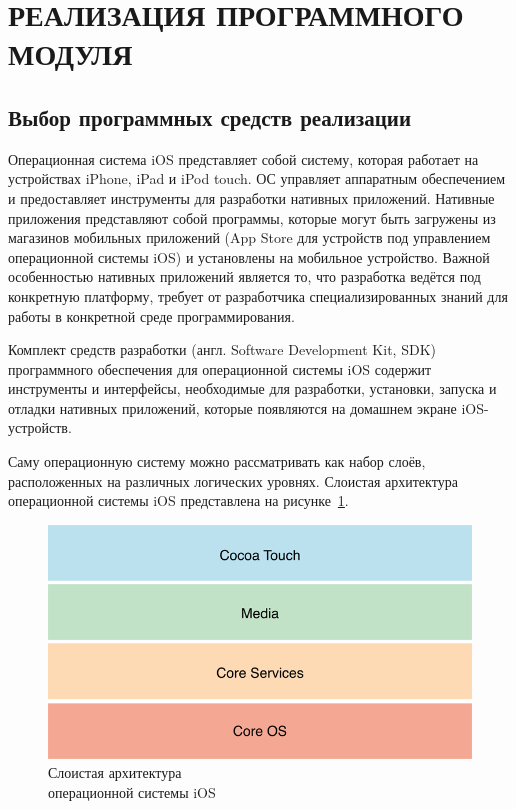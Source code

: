 \section[Реализация программного модуля]{%
  РЕАЛИЗАЦИЯ ПРОГРАММНОГО МОДУЛЯ
}\label{sec:implementation}

\subsection{Выбор программных средств реализации}


Операционная система iOS представляет собой систему, которая работает
на устройствах iPhone, iPad и iPod touch. ОС управляет аппаратным обеспечением
и предоставляет инструменты для разработки нативных приложений.
Нативные приложения представляют собой программы, которые могут быть загружены
из магазинов мобильных приложений (App Store для устройств под управлением
операционной системы iOS) и установлены на мобильное устройство.
Важной особенностью нативных приложений является то,
что разработка ведётся под конкретную платформу, требует
от разработчика специализированных знаний для работы в конкретной
среде программирования.

Комплект средств разработки (англ. Software Development Kit, SDK) программного
обеспечения для операционной системы iOS содержит инструменты
и интерфейсы, необходимые для разработки, установки, запуска
и отладки нативных приложений, которые появляются на домашнем экране iOS-устройств.

Саму операционную систему можно рассматривать как набор слоёв,
расположенных на различных логических уровнях. Слоистая архитектура операционной
системы iOS представлена на рисунке~\ref{fig:ios_layers}.
\begin{figure}[h!]
  \centering
  \includegraphics[width=130mm]{fig/ios_layers}
  \caption{Слоистая архитектура \\ операционной системы iOS}
  \label{fig:ios_layers}
\end{figure}

